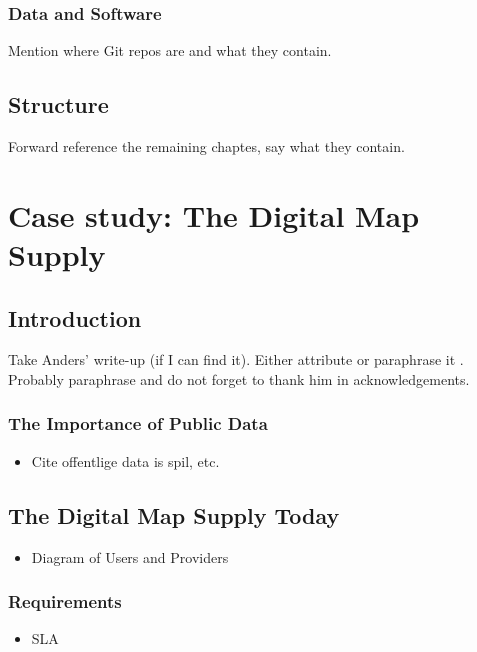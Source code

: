 \documentclass[11pt, oneside]{report}
\begin{document}
\subsection{Data and Software}

Mention where Git repos are and what they contain.

\section{Structure}
\label{sec:introduction:structure}

Forward reference the remaining chaptes, say what they contain.


\chapter{Case study: The Digital Map Supply}
\label{chapter:case:study}

\section{Introduction}
Take Anders' write-up (if I can find it). Either attribute or paraphrase it . Probably paraphrase and do not forget to thank him in acknowledgements.

\subsection{The Importance of Public Data}
\begin{itemize}
\item Cite offentlige data is spil, etc.
\end{itemize}

\section{The Digital Map Supply Today}

\begin{itemize}
\item Diagram of Users and Providers
\end{itemize}

\subsection{Requirements}
\begin{itemize}
\item SLA
\end{itemize}
\end{document}
